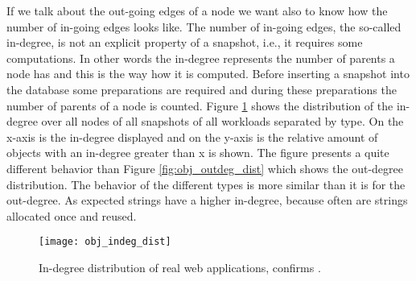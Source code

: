 If we talk about the out-going edges of a node we want also to know how the number of in-going edges looks like. The number of in-going edges, the so-called in-degree, is not an explicit property of a snapshot, i.e., it requires some computations. In other words the in-degree represents the number of parents a node has and this is the way how it is computed. Before inserting a snapshot into the database some preparations are required and during these preparations the number of parents of a node is counted. Figure \ref{fig:obj_indeg_dist} shows the distribution of the in-degree over all nodes of all snapshots of all workloads separated by type. On the x-axis is the in-degree displayed and on the y-axis is the relative amount of objects with an in-degree greater than x is shown. The figure presents a quite different behavior than Figure \ref{fig:obj_outdeg_dist} which shows the out-degree distribution. The behavior of the different types is more similar than it is for the out-degree. As expected strings have a higher in-degree, because often are strings allocated once and reused.
\begin{figure}
	\centering
	\texttt{[image: obj\_indeg\_dist]}
	\caption{In-degree distribution of real web applications, confirms \cite{JSMeter2009}.}
	\label{fig:obj_indeg_dist}
\end{figure}

